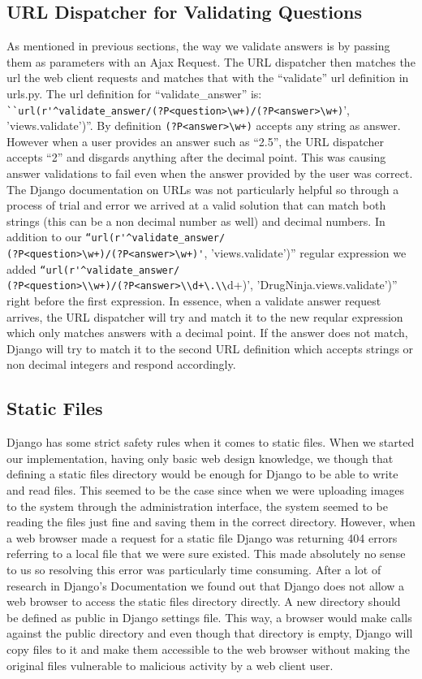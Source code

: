\documentclass{l3proj}
\begin{document}
{\subsection{URL Dispatcher for Validating Questions}
As mentioned in previous sections, the way we validate answers is by passing them as parameters with an Ajax Request.  The URL dispatcher then matches the url the web client requests and matches that with the ``validate'' url definition in urls.py. The url definition for ``validate\_answer'' is: \verb|``url(r'^validate_answer/(?P<question>\w+)/(?P<answer>\w+)|', 'views.validate')''. By definition \verb|(?P<answer>\w+)| accepts any string as answer. However when a user provides an answer such as “2.5”, the URL dispatcher accepts “2” and disgards anything after the decimal point. This was causing answer validations to fail even when the answer provided by the user was correct. The Django documentation on URLs was not particularly helpful so through a process of trial and error we arrived at a valid solution that can match both strings (this can be a non decimal number as well) and decimal numbers. In addition to our \verb|“url(r'^validate_answer/|\\\verb|(?P<question>\w+)/(?P<answer>\w+)'|, 'views.validate')” regular expression we added \verb|“url(r'^validate_answer/|\\\verb|(?P<question>\\w+)/(?P<answer>\\d+\.\\|d+)', 'DrugNinja.views.validate')” right before the first expression. In essence, when a validate answer request arrives, the URL dispatcher will try and match it to the new reqular expression which only matches answers with a decimal point. If the answer does not match, Django will try to match it to the second URL definition which accepts strings or non decimal integers and respond accordingly.

\subsection{Static Files}
Django has some strict safety rules when it comes to static files. When we started our implementation, having only basic web design knowledge, we though that defining a static files directory would be enough for Django to be able to write and read files. This seemed to be the case since when we were uploading images to the system through the administration interface, the system seemed to be reading the files just fine and saving them in the correct directory. However, when a web browser made a request for a static file Django was returning 404 errors referring to a local file that we were sure existed. This made absolutely no sense to us so resolving this error was particularly time consuming. After a lot of research in Django's Documentation we found out that Django does not allow a web browser to access the static files directory directly. A new directory should be defined as public in Django settings file. This way, a browser would make calls against the public directory and even though that directory is empty, Django will copy files to it and make them accessible to the web browser without making the original files vulnerable to malicious activity by a web client user.
}
\end{document}
